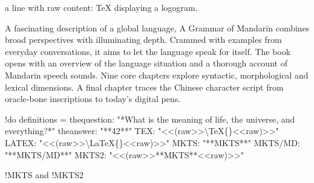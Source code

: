 
a line with raw content: \TeX{} displaying a logogram.\mktsShowpar\par
\mktsShowpar\par
A fascinating description of a global language, {\mktsStyleItalic{}A Grammar of Mandarin\/} combines broad perspectives with illuminating depth. Crammed with examples from everyday conversations, it aims to let the language speak for itself. The book opens with an overview of the language situation and a thorough account of Mandarin speech sounds. Nine core chapters explore syntactic, morphological and lexical dimensions. A final chapter traces the Chinese character script from oracle-bone inscriptions to today’s digital pens.\mktsShowpar\par

\mktsShowpar\par
{\mktsStyleBold\color{violet}{%
\mktsStyleSymbol█}!do 
definitions =
  thequestion:    "*What is the meaning of life, the universe, and everything?*"
  theanswer:      "**42**"
  TEX:            "<<(raw>>\textbackslash{}TeX\{\}<<raw)>>"
  LATEX:          "<<(raw>>\textbackslash{}LaTeX\{\}<<raw)>>"
  MKTS:           "**MKTS**"
  MKTS/MD:        "**MKTS/MD**"
  MKTS2:          "<<(raw>>**MKTS**<<raw)>>"
{\mktsStyleSymbol}}\mktsShowpar\par
{\mktsStyleBold\color{violet}{%
\mktsStyleSymbol█}!MKTS {\mktsStyleSymbol}} and {\mktsStyleBold\color{violet}{%
\mktsStyleSymbol█}!MKTS2 {\mktsStyleSymbol}}

